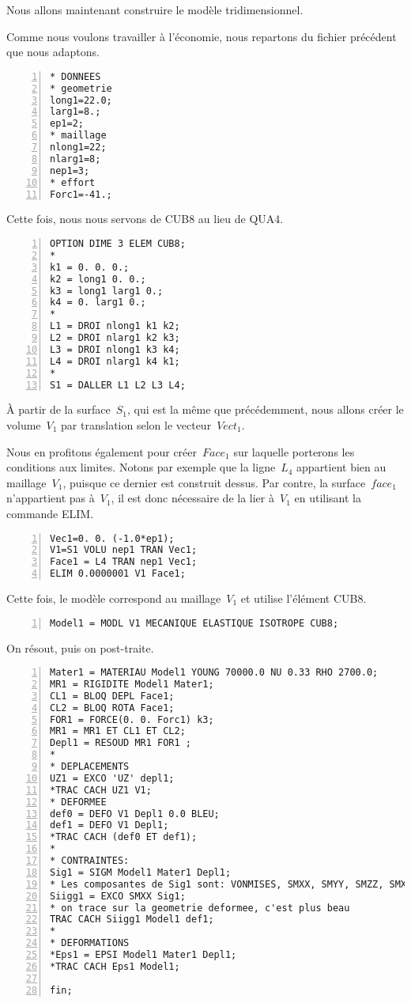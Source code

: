 Nous allons maintenant construire le modèle tridimensionnel.

Comme nous voulons travailler à l'économie, nous repartons du fichier précédent que nous adaptons.

\begin{Verbatim}[numbers=left,numbersep=3pt]
* DONNEES
* geometrie
long1=22.0;
larg1=8.;
ep1=2;
* maillage
nlong1=22;
nlarg1=8;
nep1=3;
* effort
Forc1=-41.;
\end{Verbatim}

\medskip
Cette fois, nous nous servons de CUB8 au lieu de QUA4.

\begin{Verbatim}[numbers=left,numbersep=3pt,firstnumber=last]
OPTION DIME 3 ELEM CUB8;
*
k1 = 0. 0. 0.;
k2 = long1 0. 0.;
k3 = long1 larg1 0.;
k4 = 0. larg1 0.;
*
L1 = DROI nlong1 k1 k2;
L2 = DROI nlarg1 k2 k3;
L3 = DROI nlong1 k3 k4;
L4 = DROI nlarg1 k4 k1;
*
S1 = DALLER L1 L2 L3 L4;
\end{Verbatim}

\medskip
À partir de la surface~$S_1$, qui est la même que précédemment, nous allons créer le volume~$V_1$ par translation selon le vecteur~$Vect_1$.

Nous en profitons également pour créer~$Face_1$ sur laquelle porterons les conditions aux limites. Notons par exemple que la ligne~$L_4$ appartient bien au maillage~$V_1$, puisque ce dernier est construit dessus. Par contre, la surface~$face_1$ n'appartient pas à~$V_1$, il est donc nécessaire de la lier à~$V_1$ en utilisant la commande ELIM.

\begin{Verbatim}[numbers=left,numbersep=3pt,firstnumber=last]
Vec1=0. 0. (-1.0*ep1);
V1=S1 VOLU nep1 TRAN Vec1;
Face1 = L4 TRAN nep1 Vec1;
ELIM 0.0000001 V1 Face1;
\end{Verbatim}

\medskip
Cette fois, le modèle correspond au maillage~$V_1$ et utilise l'élément CUB8.

\begin{Verbatim}[numbers=left,numbersep=3pt,firstnumber=last]
Model1 = MODL V1 MECANIQUE ELASTIQUE ISOTROPE CUB8;
\end{Verbatim}

\medskip
On résout, puis on post-traite.

\begin{Verbatim}[numbers=left,numbersep=3pt,firstnumber=last]
Mater1 = MATERIAU Model1 YOUNG 70000.0 NU 0.33 RHO 2700.0;
MR1 = RIGIDITE Model1 Mater1;
CL1 = BLOQ DEPL Face1;
CL2 = BLOQ ROTA Face1;
FOR1 = FORCE(0. 0. Forc1) k3;
MR1 = MR1 ET CL1 ET CL2;
Depl1 = RESOUD MR1 FOR1 ;
*
* DEPLACEMENTS
UZ1 = EXCO 'UZ' depl1;
*TRAC CACH UZ1 V1;
* DEFORMEE
def0 = DEFO V1 Depl1 0.0 BLEU;
def1 = DEFO V1 Depl1;
*TRAC CACH (def0 ET def1);
*
* CONTRAINTES: 
Sig1 = SIGM Model1 Mater1 Depl1;
* Les composantes de Sig1 sont: VONMISES, SMXX, SMYY, SMZZ, SMXY, SMXZ, SMYZ
Siigg1 = EXCO SMXX Sig1;
* on trace sur la geometrie deformee, c'est plus beau
TRAC CACH Siigg1 Model1 def1;
*
* DEFORMATIONS
*Eps1 = EPSI Model1 Mater1 Depl1;
*TRAC CACH Eps1 Model1;

fin;
\end{Verbatim}
